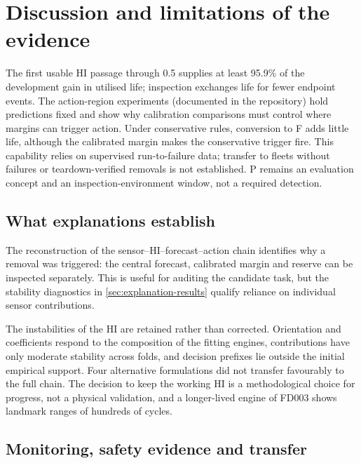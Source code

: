 \documentclass[preprint,12pt]{elsarticle}
\begin{document}
\section{Discussion and limitations of the evidence}\label{sec:pilot-discussion}

The first usable HI passage through 0.5 supplies at least 95.9\% of the development gain in utilised life; inspection exchanges life for fewer endpoint events. The action-region experiments (documented in the repository) hold predictions fixed and show why calibration comparisons must control where margins can trigger action. Under conservative rules, conversion to F adds little life, although the calibrated margin makes the conservative trigger fire. This capability relies on supervised run-to-failure data; transfer to fleets without failures or teardown-verified removals is not established. P remains an evaluation concept and an inspection-environment window, not a required detection.

\subsection{What explanations establish}

The reconstruction of the sensor--HI--forecast--action chain identifies why a removal was triggered: the central forecast, calibrated margin and reserve can be inspected separately. This is useful for auditing the candidate task, but the stability diagnostics in \cref{sec:explanation-results} qualify reliance on individual sensor contributions.

The instabilities of the HI are retained rather than corrected. Orientation and coefficients respond to the composition of the fitting engines, contributions have only moderate stability across folds, and decision prefixes lie outside the initial empirical support. Four alternative formulations did not transfer favourably to the full chain. The decision to keep the working HI is a methodological choice for progress, not a physical validation, and a longer-lived engine of FD003 shows landmark ranges of hundreds of cycles.

\subsection{Monitoring, safety evidence and transfer}
\end{document}
